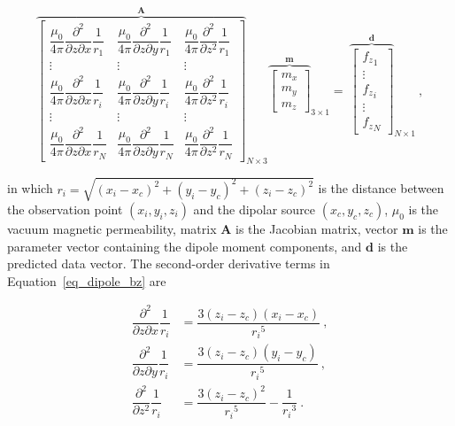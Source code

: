      \begin{equation}
    \label{eq_dipole_bz}
    {\overbrace{\begin{bmatrix}
    \dfrac{\mu_0}{4\pi} \dfrac{\partial^2}{\partial z \partial x} \dfrac{1}{r_1}
    & \dfrac{\mu_0}{4\pi} \dfrac{\partial^2}{\partial z \partial y} \dfrac{1}{r_1}
    & \dfrac{\mu_0}{4\pi} \dfrac{\partial^2}{\partial z^2} \dfrac{1}{r_1}
    \\
    \vdots & \vdots & \vdots
    \\
    \dfrac{\mu_0}{4\pi} \dfrac{\partial^2}{\partial z \partial x} \dfrac{1}{r_i}
    & \dfrac{\mu_0}{4\pi} \dfrac{\partial^2}{\partial z \partial y} \dfrac{1}{r_i}
    & \dfrac{\mu_0}{4\pi} \dfrac{\partial^2}{\partial z^2} \dfrac{1}{r_i}
    \\
    \vdots & \vdots & \vdots
    \\
    \dfrac{\mu_0}{4\pi} \dfrac{\partial^2}{\partial z \partial x} \dfrac{1}{r_N}
    & \dfrac{\mu_0}{4\pi} \dfrac{\partial^2}{\partial z \partial y} \dfrac{1}{r_N}
    & \dfrac{\mu_0}{4\pi} \dfrac{\partial^2}{\partial z^2} \dfrac{1}{r_N}
    \end{bmatrix}}^{\mathbf{A}}}_{N \times 3}
    {\overbrace{{\begin{bmatrix}
    m_x \\ m_y \\ m_z
    \end{bmatrix}}}^{\mathbf{m}}}_{3 \times 1}
    =
    ~{\overbrace{\begin{bmatrix}
    {f_z}_1
    \\
    \vdots
    \\
    {f_z}_i
    \\
    \vdots
    \\
    {f_z}_N
    \end{bmatrix}}^{\mathbf{d}}}_{N \times 1}
    \ ,
    \end{equation}

    \noindent
    in which $r_i = \sqrt{(x_i - x_c)^2 + (y_i - y_c)^2 + (z_i - z_c)^2}$ is the distance between the observation point $(x_i, y_i, z_i)$ and the dipolar source $(x_c, y_c, z_c)$, $\mu_0$ is the vacuum magnetic permeability, matrix $\mathbf{A}$ is the Jacobian matrix, vector $\mathbf{m}$ is the parameter vector containing the dipole moment components, and $\mathbf{d}$ is the predicted data vector. The second-order derivative terms in Equation~\ref{eq_dipole_bz} are
    
    \begin{equation}
    \begin{aligned}
    \dfrac{\partial^2}{\partial z \partial x} \dfrac{1}{r_i} &=
    \dfrac{3(z_i - z_c)(x_i - x_c)}{{r_i}^5}\ ,
    \\
    \dfrac{\partial^2}{\partial z \partial y} \dfrac{1}{r_i} &=
    \dfrac{3(z_i - z_c)(y_i - y_c)}{{r_i}^5}\ ,
    \\
    \dfrac{\partial^2}{\partial z^2} \dfrac{1}{r_i} &=
    \dfrac{3(z_i - z_c)^2}{{r_i}^5} - \dfrac{1}{{r_i}^3}\ .
    \end{aligned}
    \end{equation}

